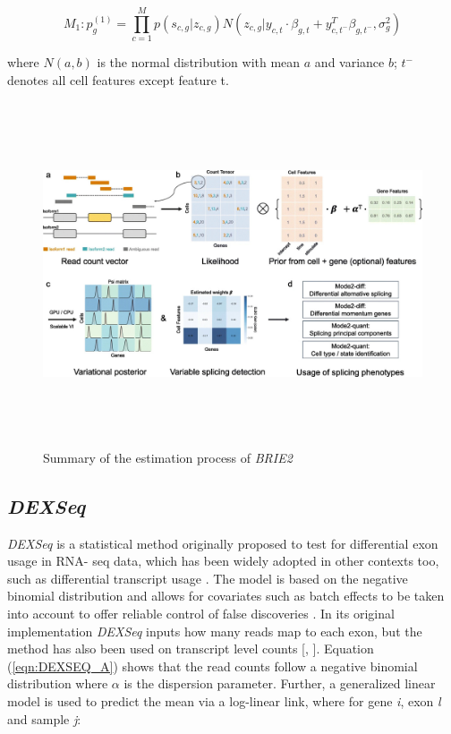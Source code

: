 \begin{equation}
M_1: p_g^{(1)} = \prod_{c=1}^{M}{p(s_{c,g} | z_{c,g}) N(z_{c,g} | y_{c,t} \cdot \beta_{g,t} + y_{c,t^-}^T \beta_{g,t^-}, \sigma_g^2)}
\label{eqn:brie_C}
\end{equation}

where $N(a,b)$ is the normal distribution with mean $a$ and variance $b$; $t^-$ denotes all cell features except feature t.

\begin{figure}[!htb]
\begin{center}
\includegraphics[width=6in,height=4in]{../figures/brie2_process.jpg}
\end{center}
\caption{Summary of the estimation process of \emph{BRIE2} \citep{brie2}}
\label{fig:brie2_process}
\end{figure}
\FloatBarrier

\subsection{\emph{DEXSeq}}
\emph{DEXSeq} \citep{dexseq} is a statistical method originally proposed to test for differential exon usage in RNA- seq data, which has been widely adopted in other contexts too, such as differential transcript usage \citep{swimming_downstream}. The model is based on the negative binomial distribution and allows for covariates such as batch effects to be taken into account to offer reliable control of false discoveries \citep{dexseq}. In its original implementation \emph{DEXSeq} inputs how many reads map to each exon, but the method has also been used on transcript level counts [\citep{swimming_downstream}, \citep{bandits}]. Equation (\ref{eqn:DEXSEQ_A}) shows that the read counts follow a negative binomial distribution where $\alpha$ is the dispersion parameter. Further, a generalized linear model is used to predict the mean via a log-linear link, where for gene \emph{i}, exon \emph{l} and sample \emph{j}:


